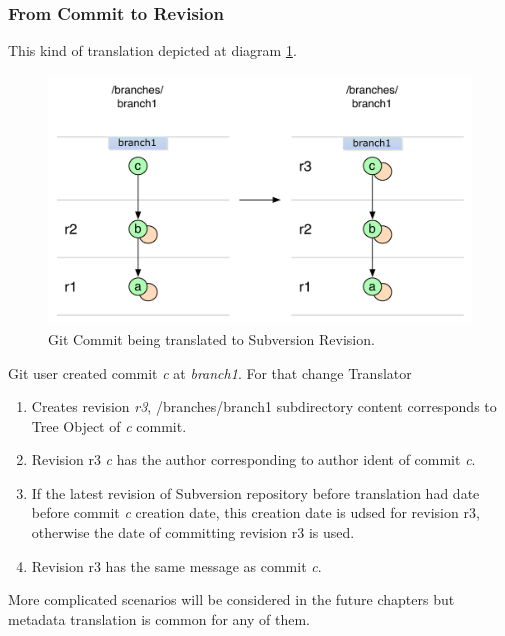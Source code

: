 \subsubsection{From Commit to Revision}

This kind of translation depicted at diagram \ref{single_change_git_to_svn}.

\begin{figure}[!h]
\centering
\renewcommand{\figurename}{Diagram}
\includegraphics[width=\linewidth]{img/diagrams/single_change_git_to_svn.pdf}
\caption{Git Commit being translated to Subversion Revision.}
\label{single_change_git_to_svn}
\end{figure}

Git user created commit \emph{c} at \emph{branch1}. For that change Translator
\begin{enumerate}
	\item Creates revision \emph{r3}, /branches/branch1 subdirectory content corresponds to Tree Object of \emph{c} commit.
	\item Revision r3 \emph{c} has the author corresponding to author ident of commit \emph{c}.
	\item If the latest revision of Subversion repository before translation had date before commit \emph{c} creation date, this creation date is udsed for revision r3, otherwise the date of committing revision r3 is used.
	\item Revision r3 has the same message as commit \emph{c}.
\end{enumerate}

More complicated scenarios will be considered in the future chapters but metadata translation is common for any of them.